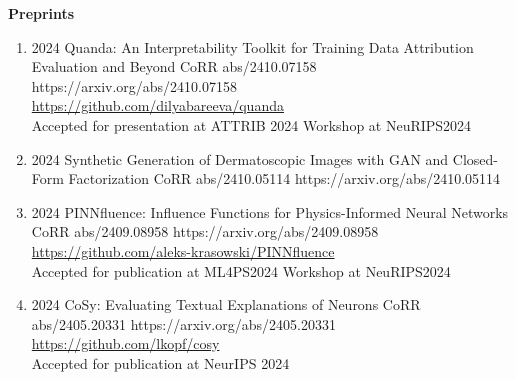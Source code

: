 \headedsection %
{\bf Preprints}{}
{
    \begin{enumerate}

        \item {}
                        {2024}
                        {Quanda: An Interpretability Toolkit for Training Data Attribution Evaluation and Beyond}
                        {CoRR abs/2410.07158}
                        {https://arxiv.org/abs/2410.07158}
                        {\\\href{https://github.com/dilyabareeva/quanda}{https://github.com/dilyabareeva/quanda}\\
                        Accepted for presentation at ATTRIB 2024 Workshop at NeuRIPS2024}
    
        \item {}
                        {2024}
                        {Synthetic Generation of Dermatoscopic Images with GAN and Closed-Form Factorization}
                        {CoRR abs/2410.05114}
                        {https://arxiv.org/abs/2410.05114}
    
        \item {}
                        {2024}
                        {PINNfluence: Influence Functions for Physics-Informed Neural Networks}
                        {CoRR abs/2409.08958}
                        {https://arxiv.org/abs/2409.08958}
                        {\\\href{https://github.com/aleks-krasowski/PINNfluence}{https://github.com/aleks-krasowski/PINNfluence}\\
                        Accepted for publication at ML4PS2024 Workshop at NeuRIPS2024}

        \item {}
                        {2024}
                        {CoSy: Evaluating Textual Explanations of Neurons}
                        {CoRR abs/2405.20331}
                        {https://arxiv.org/abs/2405.20331}
                        {\\ \href{https://github.com/lkopf/cosy}{https://github.com/lkopf/cosy}\\
                        Accepted for publication at NeurIPS 2024}


\end{enumerate}}
